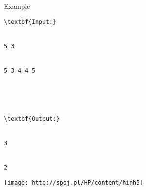 Example
\begin{verbatim}
\textbf{Input:}


5 3


5 3 4 4 5





\textbf{Output:}


3


2\end{verbatim}


\texttt{[image: http://spoj.pl/HP/content/hinh5]}